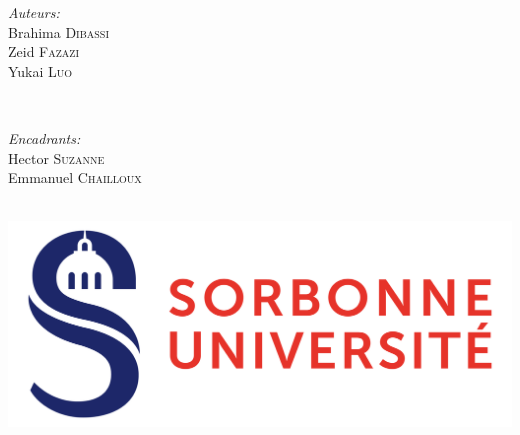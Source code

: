\documentclass[12pt]{article}
\begin{document}
\begin{titlepage}
      \begin{minipage}{0.4\textwidth}
            \begin{flushleft} \large
                  \emph{Auteurs:}\\
                  Brahima \textsc{Dibassi} \\
                  Zeid \textsc{Fazazi}\\
                  Yukai \textsc{Luo}
                  \vspace{2.5cm}
            \end{flushleft}
      \end{minipage}
      ~
      \begin{minipage}{0.55\textwidth}
            \begin{flushright} \large
                  \emph{Encadrants:} \\
                  Hector \textsc{Suzanne}\\ %
                  Emmanuel \textsc{Chailloux}\\ %
                  \textsc{}

                  \vspace{2.5cm}
            \end{flushright}
      \end{minipage}\\[1cm]





      \includegraphics[scale=0.6]{Figures/Logo.png}\\[1cm] %


      \vfill %

\end{titlepage}
\newpage
\end{document}
